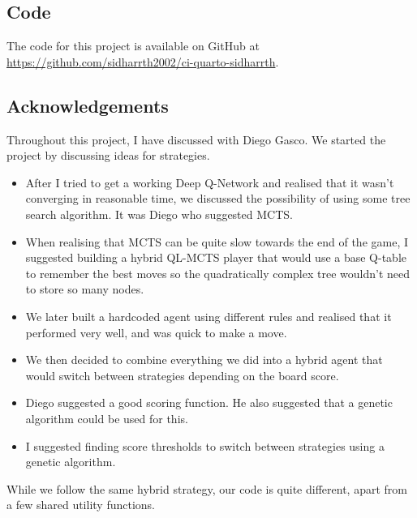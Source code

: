 \subsection{Code}

The code for this project is available on GitHub at \url{https://github.com/sidharrth2002/ci-quarto-sidharrth}.

\subsection{Acknowledgements}

Throughout this project, I have discussed with Diego Gasco. We started the project by discussing ideas for strategies.

\begin{itemize}
    \item After I tried to get a working Deep Q-Network and realised that it wasn't converging in reasonable time, we discussed the possibility of using some tree search algorithm. It was Diego who suggested MCTS.
    \item When realising that MCTS can be quite slow towards the end of the game, I suggested building a hybrid QL-MCTS player that would use a base Q-table to remember the best moves so the quadratically complex tree wouldn't need to store so many nodes.
    \item We later built a hardcoded agent using different rules and realised that it performed very well, and was quick to make a move.
    \item We then decided to combine everything we did into a hybrid agent that would switch between strategies depending on the board score.
    \item Diego suggested a good scoring function. He also suggested that a genetic algorithm could be used for this.
    \item I suggested finding score thresholds to switch between strategies using a genetic algorithm.
\end{itemize}

While we follow the same hybrid strategy, our code is quite different, apart from a few shared utility functions.

